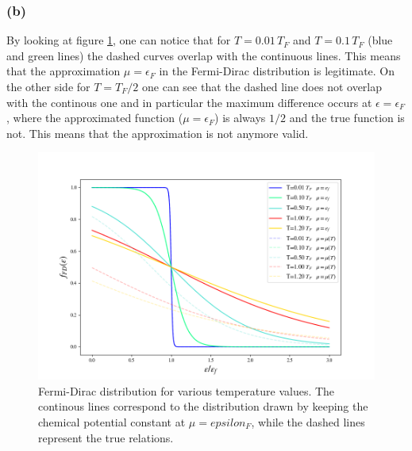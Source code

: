 \documentclass{article}
\begin{document}
\subsubsection*{(b)}
By looking at figure \ref{fig:fFD_mu}, one can notice that for $T=0.01 \, T_F$ and $T=0.1 \, T_F$ (blue and green lines) the dashed curves overlap with the continuous lines. This means that the approximation 
$\mu = \epsilon_F$ in the Fermi-Dirac distribution is legitimate. On the other side for $T=T_F/2$ one can see that the dashed line does not overlap with the continous one and in particular the maximum difference 
occurs at $\epsilon = \epsilon_F$, where the approximated function ($\mu = \epsilon_F$) is always $1/2$ and the true function is not. This means that the approximation is not anymore valid.
\begin{figure}[htp]
    \centering 
    \includegraphics[scale=0.5]{scripts/f_fd_mu.png}
    \caption{Fermi-Dirac distribution for various temperature values. The continous lines correspond to 
    the distribution drawn by keeping the chemical potential constant at $\mu=epsilon_F$, while the dashed lines represent the true relations.}
    \label{fig:fFD_mu}
\end{figure}
\end{document}
